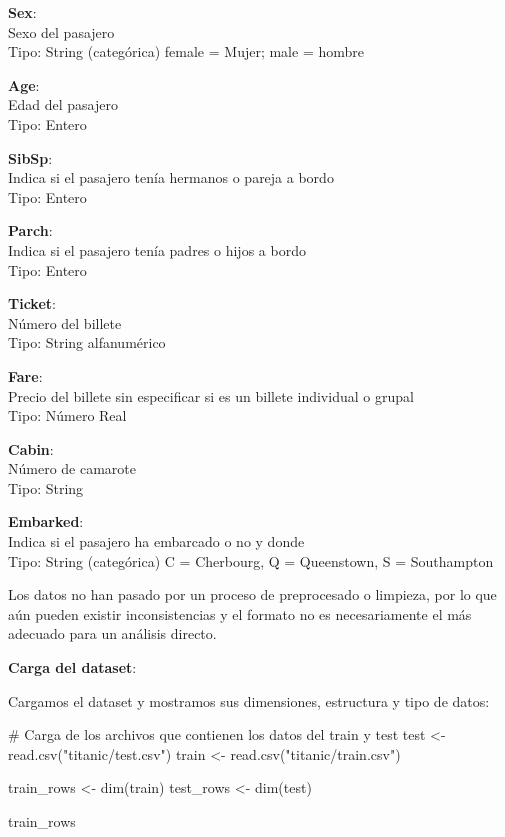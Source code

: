 \documentclass[
]{article}
\newenvironment{Shaded}{\begin{snugshade}}{\end{snugshade}}
\newcommand{\CommentTok}[1]{\textcolor[rgb]{0.50,0.62,0.50}{#1}}
\newcommand{\KeywordTok}[1]{\textcolor[rgb]{0.94,0.87,0.69}{#1}}
\newcommand{\NormalTok}[1]{\textcolor[rgb]{0.80,0.80,0.80}{#1}}
\newcommand{\StringTok}[1]{\textcolor[rgb]{0.80,0.58,0.58}{#1}}
\begin{document}
\textbf{Sex}:\\
Sexo del pasajero\\
Tipo: String (categórica) female = Mujer; male = hombre

\textbf{Age}:\\
Edad del pasajero\\
Tipo: Entero

\textbf{SibSp}:\\
Indica si el pasajero tenía hermanos o pareja a bordo\\
Tipo: Entero

\textbf{Parch}:\\
Indica si el pasajero tenía padres o hijos a bordo\\
Tipo: Entero

\textbf{Ticket}:\\
Número del billete\\
Tipo: String alfanumérico

\textbf{Fare}:\\
Precio del billete sin especificar si es un billete individual o
grupal\\
Tipo: Número Real

\textbf{Cabin}:\\
Número de camarote\\
Tipo: String

\textbf{Embarked}:\\
Indica si el pasajero ha embarcado o no y donde\\
Tipo: String (categórica) C = Cherbourg, Q = Queenstown, S = Southampton

Los datos no han pasado por un proceso de preprocesado o limpieza, por
lo que aún pueden existir inconsistencias y el formato no es
necesariamente el más adecuado para un análisis directo.

\textbf{Carga del dataset}:

Cargamos el dataset y mostramos sus dimensiones, estructura y tipo de
datos:

\begin{Shaded}
\begin{Highlighting}[]
\CommentTok{# Carga de los archivos que contienen los datos del train y test}
\NormalTok{test <-}\StringTok{ }\KeywordTok{read.csv}\NormalTok{(}\StringTok{"titanic/test.csv"}\NormalTok{)}
\NormalTok{train <-}\StringTok{ }\KeywordTok{read.csv}\NormalTok{(}\StringTok{"titanic/train.csv"}\NormalTok{)}

\NormalTok{train_rows <-}\StringTok{ }\KeywordTok{dim}\NormalTok{(train)}
\NormalTok{test_rows <-}\StringTok{ }\KeywordTok{dim}\NormalTok{(test)}

\NormalTok{train_rows}
\end{Highlighting}
\end{Shaded}
\end{document}
